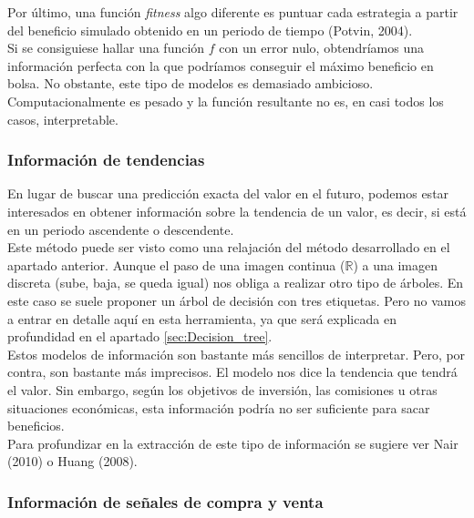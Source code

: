     Por \'ultimo, una funci\'on \textit{fitness} algo diferente es puntuar cada estrategia a partir del beneficio simulado obtenido en un periodo de tiempo (Potvin, 2004).\\
    
     Si se consiguiese hallar una funci\'on $f$ con un error nulo, obtendr\'iamos una informaci\'on perfecta con la que podr\'iamos conseguir el m\'aximo beneficio en bolsa. No obstante, este tipo de modelos es demasiado ambicioso. Computacionalmente es pesado y la funci\'on resultante no es, en casi todos los casos, interpretable.\\
     
     
     \subsubsection{Informaci\'on de tendencias}
     
     En lugar de buscar una predicci\'on exacta del valor en el futuro, podemos estar interesados en obtener informaci\'on sobre la tendencia de un valor, es decir, si est\'a en un periodo ascendente o descendente. \\
     
     Este m\'etodo puede ser visto como una relajaci\'on del m\'etodo desarrollado en el apartado anterior. Aunque el paso de una imagen continua ($\mathbb{R}$) a una imagen discreta (sube, baja, se queda igual) nos obliga a realizar otro tipo de \'arboles. En este caso se suele proponer un \'arbol de decisi\'on con tres etiquetas. Pero no vamos a entrar en detalle aqu\'i en esta herramienta, ya que ser\'a explicada en profundidad en el apartado \ref{sec:Decision_tree}.\\
     
     Estos modelos de informaci\'on son bastante m\'as sencillos de interpretar. Pero, por contra, son bastante m\'as imprecisos. El modelo nos dice la tendencia que tendr\'a el valor. Sin embargo, seg\'un los objetivos de inversi\'on, las comisiones u otras situaciones econ\'omicas, esta informaci\'on podr\'ia no ser suficiente para sacar beneficios.\\
     
     Para profundizar en la extracci\'on de este tipo de informaci\'on se sugiere ver Nair (2010) o Huang (2008).\\
     
     
     \subsubsection{Informaci\'on de se\~nales de compra y venta}
     
